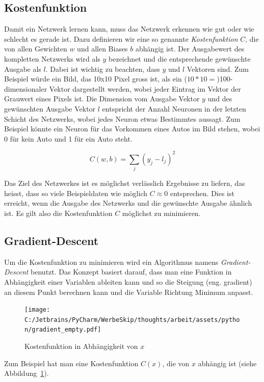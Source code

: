 \documentclass[12pt,a4paper]{report}
\begin{document}
\subsection{Kostenfunktion}
Damit ein Netzwerk lernen kann, muss das Netzwerk erkennen wie gut oder wie schlecht es gerade ist.
Dazu definieren wir eine so genannte \textit{Kostenfunktion} $C$, die von allen Gewichten $w$ und allen Biases $b$ abhängig ist.
Der Ausgabewert des kompletten Netzwerks wird als $y$ bezeichnet und die entsprechende gewünschte Ausgabe als $l$.
Dabei ist wichtig zu beachten, dass $y$ und $l$ Vektoren sind.
Zum Beispiel würde ein Bild, das 10x10 Pixel gross ist, als ein ($10 * 10 =$)100-dimensionaler Vektor dargestellt werden,
wobei jeder Eintrag im Vektor der Grauwert eines Pixels ist.
Die Dimension vom Ausgabe Vektor $y$ und des gewünschten Ausgabe Vektor $l$ entspricht der Anzahl Neuronen in der letzten Schicht des Netzwerks,
wobei jedes Neuron etwas Bestimmtes aussagt.
Zum Beispiel könnte ein Neuron für das Vorkommen eines Autos im Bild stehen, wobei 0 für kein Auto und 1 für ein Auto steht.

\[C(w,b) = \sum_{j}(y_j - l_j)^2\]

Das Ziel des Netzwerkes ist es möglichst verlässlich Ergebnisse zu liefern, das heisst, dass so viele Beispieldaten wie möglich $C \approx 0$ entsprechen.
Dies ist erreicht, wenn die Ausgabe des Netzwerks und die gewünschte Ausgabe ähnlich ist.
Es gilt also die Kostenfunktion $C$ möglichst zu minimieren.
\subsection{Gradient-Descent}\label{subsec:gradientDescent}
Um die Kostenfunktion zu minimieren wird ein Algorithmus namens \textit{Gradient-Descent} benutzt.
Das Konzept basiert darauf, dass man eine Funktion in Abhängigkeit einer Variablen ableiten kann und so die Steigung (eng. gradient)
an diesem Punkt berechnen kann und die Variable Richtung Minimum anpasst.

\begin{figure}[!h]%
    \centering
    \texttt{[image: C:/Jetbrains/PyCharm/WerbeSkip/thoughts/arbeit/assets/python/gradient\_empty.pdf]} %
    \caption{Kostenfunktion in Abhängigkeit von $x$}%
    \label{fig:grad1}%
\end{figure}

Zum Beispiel hat man eine Kostenfunktion $C(x)$, die von $x$ abhängig ist (siehe Abbildung~\ref{fig:grad1}).
\end{document}
